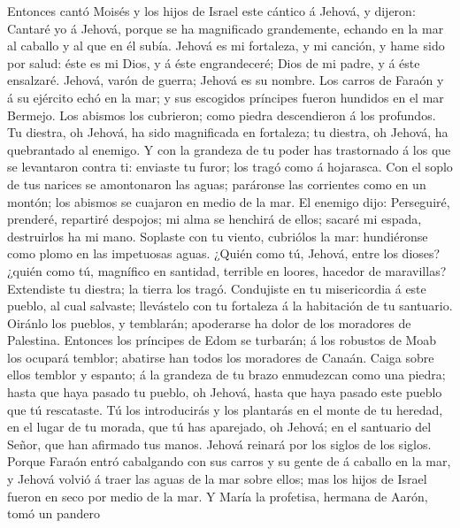  Entonces cantó Moisés y los hijos de Israel este cántico
á Jehová, y dijeron: Cantaré yo á Jehová, porque se ha magnificado
grandemente, echando en la mar al caballo y al que en él subía.
 Jehová es mi fortaleza, y mi canción, y hame sido por
salud: éste es mi Dios, y á éste engrandeceré; Dios de mi padre, y á
éste ensalzaré.  Jehová, varón de guerra; Jehová es su
nombre.  Los carros de Faraón y á su ejército echó en la
mar; y sus escogidos príncipes fueron hundidos en el mar Bermejo.
 Los abismos los cubrieron; como piedra descendieron á los
profundos.  Tu diestra, oh Jehová, ha sido magnificada en
fortaleza; tu diestra, oh Jehová, ha quebrantado al enemigo.
 Y con la grandeza de tu poder has trastornado á los que
se levantaron contra ti: enviaste tu furor; los tragó como á hojarasca.
 Con el soplo de tus narices se amontonaron las aguas;
paráronse las corrientes como en un montón; los abismos se cuajaron en
medio de la mar.  El enemigo dijo: Perseguiré, prenderé,
repartiré despojos; mi alma se henchirá de ellos; sacaré mi espada,
destruirlos ha mi mano.  Soplaste con tu viento,
cubriólos la mar: hundiéronse como plomo en las impetuosas aguas.
 ¿Quién como tú, Jehová, entre los dioses? ¿quién como
tú, magnífico en santidad, terrible en loores, hacedor de maravillas?
 Extendiste tu diestra; la tierra los tragó.
 Condujiste en tu misericordia á este pueblo, al cual
salvaste; llevástelo con tu fortaleza á la habitación de tu santuario.
 Oiránlo los pueblos, y temblarán; apoderarse ha dolor de
los moradores de Palestina.  Entonces los príncipes de
Edom se turbarán; á los robustos de Moab los ocupará temblor; abatirse
han todos los moradores de Canaán.  Caiga sobre ellos
temblor y espanto; á la grandeza de tu brazo enmudezcan como una piedra;
hasta que haya pasado tu pueblo, oh Jehová, hasta que haya pasado este
pueblo que tú rescataste.  Tú los introducirás y los
plantarás en el monte de tu heredad, en el lugar de tu morada, que tú
has aparejado, oh Jehová; en el santuario del Señor, que han afirmado
tus manos.  Jehová reinará por los siglos de los siglos.
 Porque Faraón entró cabalgando con sus carros y su gente
de á caballo en la mar, y Jehová volvió á traer las aguas de la mar
sobre ellos; mas los hijos de Israel fueron en seco por medio de la mar.
 Y María la profetisa, hermana de Aarón, tomó un pandero
